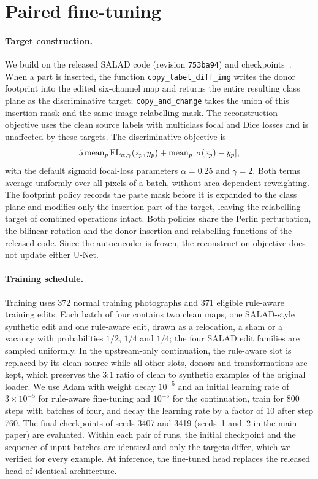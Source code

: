 \documentclass[10pt,twocolumn,letterpaper]{article}
\begin{document}
\section{Paired fine-tuning}
\paragraph{Target construction.}
We build on the released SALAD code (revision \texttt{753ba94}) and checkpoints~\cite{fucka2025}. When a part is inserted, the function \texttt{copy\_label\_diff\_img} writes the donor footprint into the edited six-channel map and returns the entire resulting class plane as the discriminative target; \texttt{copy\_and\_change} takes the union of this insertion mask and the same-image relabelling mask. The reconstruction objective uses the clean source labels with multiclass focal and Dice losses and is unaffected by these targets. The discriminative objective is
\[
  5\,{\rm mean}_{p}\,{\rm FL}_{\alpha,\gamma}(z_p,y_p)
  + {\rm mean}_{p}\,|\sigma(z_p)-y_p|,
\]
with the default sigmoid focal-loss parameters $\alpha=0.25$ and $\gamma=2$. Both terms average uniformly over all pixels of a batch, without area-dependent reweighting. The footprint policy records the paste mask before it is expanded to the class plane and modifies only the insertion part of the target, leaving the relabelling target of combined operations intact. Both policies share the Perlin perturbation, the bilinear rotation and the donor insertion and relabelling functions of the released code. Since the autoencoder is frozen, the reconstruction objective does not update either U-Net.

\paragraph{Training schedule.}
Training uses 372 normal training photographs and 371 eligible rule-aware training edits. Each batch of four contains two clean maps, one SALAD-style synthetic edit and one rule-aware edit, drawn as a relocation, a sham or a vacancy with probabilities $1/2$, $1/4$ and $1/4$; the four SALAD edit families are sampled uniformly. In the upstream-only continuation, the rule-aware slot is replaced by its clean source while all other slots, donors and transformations are kept, which preserves the 3:1 ratio of clean to synthetic examples of the original loader. We use Adam with weight decay $10^{-5}$ and an initial learning rate of $3{\times}10^{-5}$ for rule-aware fine-tuning and $10^{-5}$ for the continuation, train for 800 steps with batches of four, and decay the learning rate by a factor of 10 after step 760. The final checkpoints of seeds 3407 and 3419 (seeds~1 and~2 in the main paper) are evaluated. Within each pair of runs, the initial checkpoint and the sequence of input batches are identical and only the targets differ, which we verified for every example. At inference, the fine-tuned head replaces the released head of identical architecture.
\end{document}
